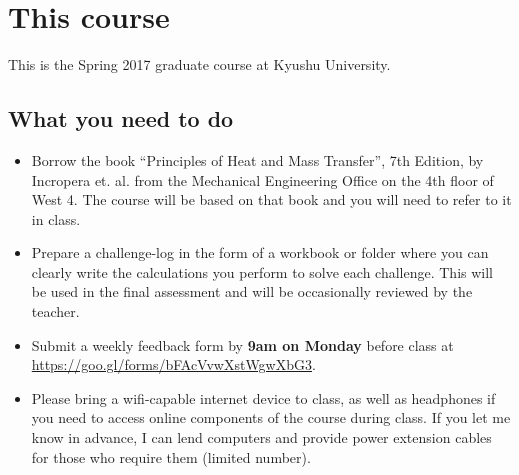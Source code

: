\section{This course}
This is the Spring 2017 \course graduate course at Kyushu University.

\subsection{What you need to do}
\begin{itemize}
    \item Borrow the book ``Principles of Heat and Mass Transfer'', 7th Edition, by Incropera et. al. from the Mechanical Engineering Office on the 4th floor of West 4. The course will be based on that book and you will need to refer to it in class.
    \item Prepare a challenge-log in the form of a workbook or folder where you can clearly write the calculations you perform to solve each challenge. This will be used in the final assessment and will be occasionally reviewed by the teacher.
    \item Submit a weekly feedback form by \textbf{9am on Monday} before class at \url{https://goo.gl/forms/bFAcVvwXstWgwXbG3}.
    \item Please bring a wifi-capable internet device to class, as well as headphones if you need to access online components of the course during class. If you let me know in advance, I can lend computers and provide power extension cables for those who require them (limited number).
\end{itemize}


